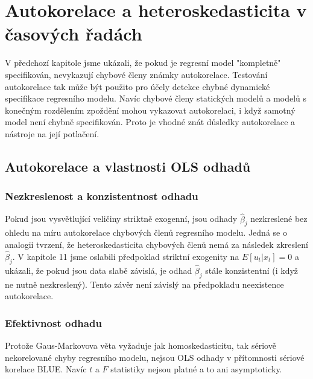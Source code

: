 \chapter{Autokorelace a heteroskedasticita v časových řadách}

V předchozí kapitole jsme ukázali, že pokud je regresní model "kompletně" specifikován, nevykazují chybové členy známky autokorelace. Testování autokorelace tak může být použito pro účely detekce chybné dynamické specifikace regresního modelu. Navíc chybové členy statických modelů a modelů s konečným rozdělením zpoždění mohou vykazovat autokorelaci, i když samotný model není chybně specifikován. Proto je vhodné znát důsledky autokorelace a nástroje na její potlačení.

\section{Autokorelace a vlastnosti OLS odhadů}

\subsection{Nezkreslenost a konzistentnost odhadu}

Pokud jsou vysvětlující veličiny striktně exogenní, jsou odhady $\hat{\beta}_j$ nezkreslené bez ohledu na míru autokorelace chybových členů regresního modelu. Jedná se o analogii tvrzení, že heteroskedasticita chybových členů nemá za následek zkreslení $\hat{\beta}_j$. V kapitole 11 jsme oslabili předpoklad striktní exogenity na $E[u_t | x_t] = 0$ a ukázali, že pokud jsou data slabě závislá, je odhad $\hat{\beta}_j$ stále konzistentní (i když ne nutně nezkreslený). Tento závěr není závislý na předpokladu neexistence autokorelace.

\subsection{Efektivnost odhadu}

Protože Gaus-Markovova věta vyžaduje jak homoskedasticitu, tak sériově nekorelované chyby regresního modelu, nejsou OLS odhady v přítomnosti sériové korelace BLUE. Navíc $t$ a $F$ statistiky nejsou platné a to ani asymptoticky.

